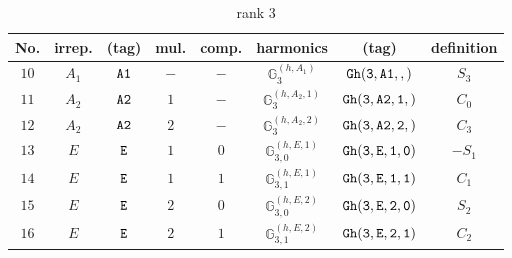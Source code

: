 \documentclass[fleqn,8pt]{jsarticle}
\begin{document}
\begin{table}[ht!]
\begin{center}
\caption{rank 3}
\renewcommand{\arraystretch}{1.3}
\begin{tabular}{cccccccc} \hline \hline
No. & irrep. & (tag) & mul. & comp. & harmonics & (tag) & definition \\ \hline
$ 10 $ & $ A_{1} $ & $ {\tt A1} $ & $ - $ & $ - $ & $ \mathbb{G}_{3}^{(h,A_{1})} $ & $ {\tt Gh(3,A1,,)} $ & $ S_{3} $ \\
$ 11 $ & $ A_{2} $ & $ {\tt A2} $ & $ 1 $ & $ - $ & $ \mathbb{G}_{3}^{(h,A_{2},1)} $ & $ {\tt Gh(3,A2,1,)} $ & $ C_{0} $ \\
$ 12 $ & $ A_{2} $ & $ {\tt A2} $ & $ 2 $ & $ - $ & $ \mathbb{G}_{3}^{(h,A_{2},2)} $ & $ {\tt Gh(3,A2,2,)} $ & $ C_{3} $ \\
$ 13 $ & $ E $ & $ {\tt E} $ & $ 1 $ & $ 0 $ & $ \mathbb{G}_{3,0}^{(h,E,1)} $ & $ {\tt Gh(3,E,1,0)} $ & $ - S_{1} $ \\
$ 14 $ & $ E $ & $ {\tt E} $ & $ 1 $ & $ 1 $ & $ \mathbb{G}_{3,1}^{(h,E,1)} $ & $ {\tt Gh(3,E,1,1)} $ & $ C_{1} $ \\
$ 15 $ & $ E $ & $ {\tt E} $ & $ 2 $ & $ 0 $ & $ \mathbb{G}_{3,0}^{(h,E,2)} $ & $ {\tt Gh(3,E,2,0)} $ & $ S_{2} $ \\
$ 16 $ & $ E $ & $ {\tt E} $ & $ 2 $ & $ 1 $ & $ \mathbb{G}_{3,1}^{(h,E,2)} $ & $ {\tt Gh(3,E,2,1)} $ & $ C_{2} $ \\
 \hline \hline
\end{tabular}
\end{center}
\end{table}
\end{document}

